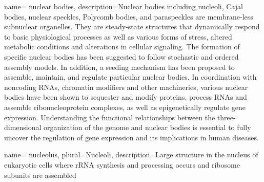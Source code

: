  {
	name= {nuclear bodies},
	description={Nuclear bodies including nucleoli, Cajal bodies, nuclear speckles, Polycomb bodies, and paraspeckles are membrane-less subnuclear organelles. They are steady-state structures that dynamically respond to basic physiological processes as well as various forms of stress, altered metabolic conditions and alterations in cellular signaling. The formation of specific nuclear bodies has been suggested to follow stochastic and ordered assembly models. In addition, a seeding mechanism has been proposed to assemble, maintain, and regulate particular nuclear bodies. In coordination with noncoding RNAs, chromatin modifiers and other machineries, various nuclear bodies have been shown to sequester and modify proteins, process RNAs and assemble ribonucleoprotein complexes, as well as epigenetically regulate gene expression. Understanding the functional relationships between the three-dimensional organization of the genome and nuclear bodies is essential to fully uncover the regulation of gene expression and its implications in human diseases.\cite{mao2011biogenesis}}}



 {
	name= {nucleolus},
	plural={Nucleoli},
	description={Large structure in the nucleus of eukaryotic cells where rRNA synthesis and processing occurs and ribosome subunits are assembled\cite{lodish2003molecular}}}

